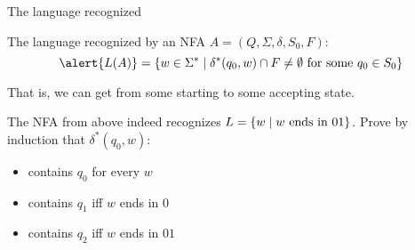 \documentclass[handout]{beamer}
\begin{document}
\begin{frame}{The language recognized}

    \begin{definition}
        The language \alert{recognized by} an NFA $A=(Q,\Sigma,\delta,S_0,F)$: 
        $$
        \alert{L(A)}=\{w\in \Sigma^* \mid \delta^*(q_0,w)\cap F\neq \emptyset\text{ for some }q_0\in S_0\}
        $$        
    \end{definition}

    That is, we can get from some starting to some accepting state. 

    \bigskip

    \begin{example}
        The NFA from above indeed recognizes $L=\{w \mid w \hbox{ ends in 01}\} $. Prove by induction that $\delta^*(q_0,w)$:
        \begin{itemize}
            \item contains $q_0$ for every $w$
            \item contains $q_1$ iff $w$ ends in $0$
            \item contains $q_2$ iff $w$ ends in $01$
        \end{itemize}
    \end{example}


\end{frame}
\end{document}
